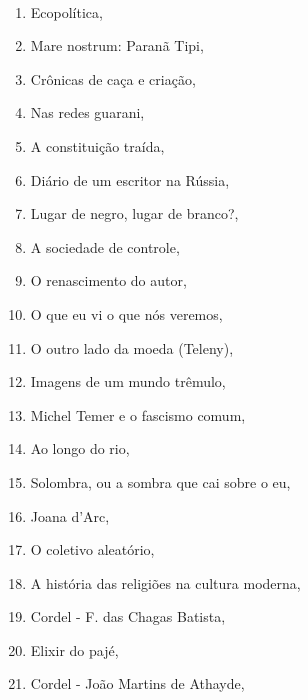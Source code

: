 \medskip


{}\\

\begin{multicols}{2}
\begin{enumerate}
\item Ecopolítica, {}	
\item Mare nostrum: Paranã Tipi, {}
\item Crônicas de caça e criação, {}
\item Nas redes guarani, {}
\item A constituição traída, {}
\item Diário de um escritor na Rússia, {}
\item Lugar de negro, lugar de branco?, {}
\item A sociedade de controle, {}
\item O renascimento do autor, {}
\item O que eu vi o que nós veremos, {}
\item O outro lado da moeda (Teleny), {}
\item Imagens de um mundo trêmulo, {}
\item Michel Temer e o fascismo comum, {}
\item Ao longo do rio, {}
\item Solombra, ou a sombra que cai sobre o eu, {}
\item Joana d'Arc, {}
\item O coletivo aleatório, {}
\item A história das religiões na cultura moderna, {}
\item Cordel - F. das Chagas Batista, {}
\item Elixir do pajé, {}
\item Cordel - João Martins de Athayde, {}

\end{enumerate}
\end{multicols}
